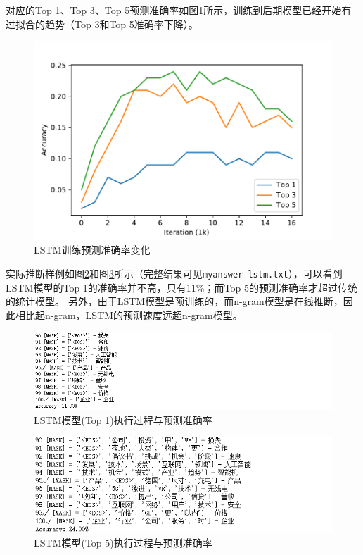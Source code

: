 \documentclass[logo,reportComp]{thesis}
\begin{document}
对应的Top 1、Top 3、Top 5预测准确率如图\ref{fig:lstm-acc}所示，训练到后期模型已经开始有过拟合的趋势（Top 3和Top 5准确率下降）。
\begin{figure}[H]
\centering
\includegraphics[width=0.8\linewidth]{fig/acc-iter.pdf}
\caption{LSTM训练预测准确率变化}
\label{fig:lstm-acc}
\end{figure}

实际推断样例如图\ref{fig:lstm-top1}和图\ref{fig:lstm-top5}所示（完整结果可见\verb'myanswer-lstm.txt'），可以看到LSTM模型的Top 1的准确率并不高，只有11\%；而Top 5的预测准确率才超过传统的统计模型。
另外，由于LSTM模型是预训练的，而n-gram模型是在线推断，因此相比起n-gram，LSTM的预测速度远超n-gram模型。
\begin{figure}[H]
\centering
\includegraphics[width=\linewidth]{fig/result-lstm-top1.png}
\caption{LSTM模型(Top 1)执行过程与预测准确率}
\label{fig:lstm-top1}
\end{figure}
\begin{figure}[H]
\centering
\includegraphics[width=\linewidth]{fig/result-lstm-top5.png}
\caption{LSTM模型(Top 5)执行过程与预测准确率}
\label{fig:lstm-top5}
\end{figure}
\end{document}
